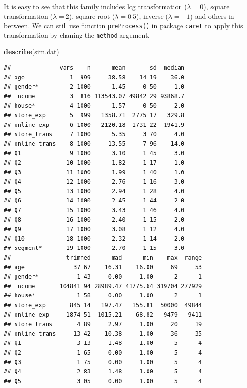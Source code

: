 \documentclass[12pt,]{krantz}
\newenvironment{Shaded}{\begin{snugshade}}{\end{snugshade}}
\newcommand{\KeywordTok}[1]{\textcolor[rgb]{0.13,0.29,0.53}{\textbf{{#1}}}}
\newcommand{\NormalTok}[1]{{#1}}
\theoremstyle{definition}
\theoremstyle{definition}
\theoremstyle{remark}
\begin{document}
It is easy to see that this family includes log transformation
(\(\lambda=0\)), square transformation (\(\lambda=2\)), square root
(\(\lambda=0.5\)), inverse (\(\lambda=-1\)) and others in-between. We
can still use function \texttt{preProcess()} in package \texttt{caret}
to apply this transformation by chaning the \texttt{method} argument.

\begin{Shaded}
\begin{Highlighting}[]
\KeywordTok{describe}\NormalTok{(sim.dat)}
\end{Highlighting}
\end{Shaded}

\begin{verbatim}
##              vars    n      mean       sd  median
## age             1  999     38.58    14.19    36.0
## gender*         2 1000      1.45     0.50     1.0
## income          3  816 113543.07 49842.29 93868.7
## house*          4 1000      1.57     0.50     2.0
## store_exp       5  999   1358.71  2775.17   329.8
## online_exp      6 1000   2120.18  1731.22  1941.9
## store_trans     7 1000      5.35     3.70     4.0
## online_trans    8 1000     13.55     7.96    14.0
## Q1              9 1000      3.10     1.45     3.0
## Q2             10 1000      1.82     1.17     1.0
## Q3             11 1000      1.99     1.40     1.0
## Q4             12 1000      2.76     1.16     3.0
## Q5             13 1000      2.94     1.28     4.0
## Q6             14 1000      2.45     1.44     2.0
## Q7             15 1000      3.43     1.46     4.0
## Q8             16 1000      2.40     1.15     2.0
## Q9             17 1000      3.08     1.12     4.0
## Q10            18 1000      2.32     1.14     2.0
## segment*       19 1000      2.70     1.15     3.0
##                trimmed      mad      min    max  range
## age              37.67    16.31    16.00     69     53
## gender*           1.43     0.00     1.00      2      1
## income       104841.94 28989.47 41775.64 319704 277929
## house*            1.58     0.00     1.00      2      1
## store_exp       845.14   197.47   155.81  50000  49844
## online_exp     1874.51  1015.21    68.82   9479   9411
## store_trans       4.89     2.97     1.00     20     19
## online_trans     13.42    10.38     1.00     36     35
## Q1                3.13     1.48     1.00      5      4
## Q2                1.65     0.00     1.00      5      4
## Q3                1.75     0.00     1.00      5      4
## Q4                2.83     1.48     1.00      5      4
## Q5                3.05     0.00     1.00      5      4

\end{verbatim}
\end{document}
